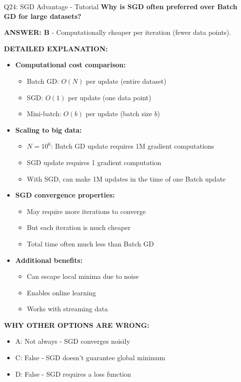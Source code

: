 \documentclass[8pt]{beamer}
\begin{document}
	\begin{frame}{Q24: SGD Advantage - Tutorial}
		\fontsize{6.5}{7.5}\selectfont
		\textbf{Why is SGD often preferred over Batch GD for large datasets?}
		
		\vspace{0.05cm}
		\textcolor{myblue}{\textbf{ANSWER: B}} - Computationally cheaper per iteration (fewer data points).
		
		\vspace{0.05cm}
		\textbf{DETAILED EXPLANATION:}
		\begin{itemize}
			\item \textbf{Computational cost comparison:}
			\begin{itemize}
				\item Batch GD: $O(N)$ per update (entire dataset)
				\item SGD: $O(1)$ per update (one data point)
				\item Mini-batch: $O(b)$ per update (batch size $b$)
			\end{itemize}
			\item \textbf{Scaling to big data:}
			\begin{itemize}
				\item $N = 10^6$: Batch GD update requires 1M gradient computations
				\item SGD update requires 1 gradient computation
				\item With SGD, can make 1M updates in the time of one Batch update
			\end{itemize}
			\item \textbf{SGD convergence properties:}
			\begin{itemize}
				\item May require more iterations to converge
				\item But each iteration is much cheaper
				\item Total time often much less than Batch GD
			\end{itemize}
			\item \textbf{Additional benefits:}
			\begin{itemize}
				\item Can escape local minima due to noise
				\item Enables online learning
				\item Works with streaming data
			\end{itemize}
		\end{itemize}
		
		\vspace{0.05cm}
		\textcolor{myred}{\textbf{WHY OTHER OPTIONS ARE WRONG:}}
		\begin{itemize}
			\item \textcolor{myred}{A:} Not always - SGD converges noisily
			\item \textcolor{myred}{C:} False - SGD doesn't guarantee global minimum
			\item \textcolor{myred}{D:} False - SGD requires a loss function
		\end{itemize}
		

\end{frame}
\end{document}
